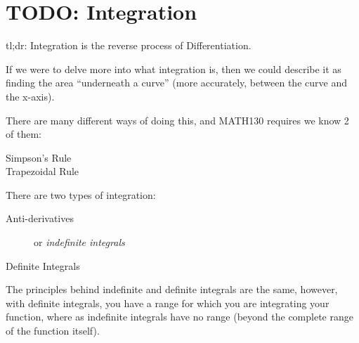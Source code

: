 \chapter{TODO: Integration}
\label{sec:Integration}
tl;dr: Integration is the reverse process of Differentiation.

If we were to delve more into what integration is, then we could describe it as
finding the area ``underneath a curve'' (more accurately, between the curve and
the x-axis).

There are many different ways of doing this, and MATH130 requires we know 2 of
them:
\begin{description}
  \item[Simpson's Rule]
  \item[Trapezoidal Rule]
\end{description}

There are two types of integration:
\begin{description}
  \item[Anti-derivatives] or \emph{indefinite integrals}

  \item[Definite Integrals]
\end{description}
The principles behind indefinite and definite integrals are the same, however,
with definite integrals, you have a range for which you are integrating your
function, where as indefinite integrals have no range (beyond the complete range
of the function itself).